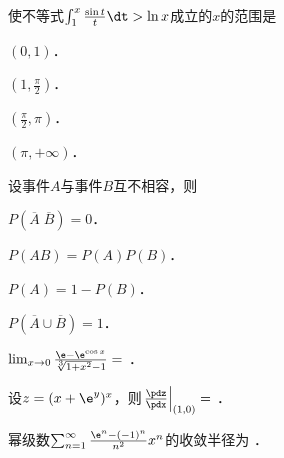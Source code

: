 \documentclass[plain,noanswer,medmath]{../../template/jnuexam}
\begin{document}










\begin{problem}
使不等式$\int_1^x \frac{\sin t}{t}\dt > \ln x$成立的$x$的范围是\pickout{}
\begin{abcd}
\item $(0,1)$．
\item $\left(1,\frac{\pi}{2} \right)$．
\item $\left(\frac{\pi}{2},\pi \right)$．
\item $(\pi , +\infty)$．
\end{abcd}
\end{problem}








\begin{problem}
设事件$A$与事件$B$互不相容，则\pickout{}
\begin{abcd}
\item $P(\overline{A}\;\overline{B}) = 0$．
\item $P(AB) = P(A)P(B)$．
\item $P(A) = 1 - P(B)$．
\item $P(\overline{A} \cup \overline{B}) = 1$．
\end{abcd}
\end{problem}






\begin{problem}
$\lim_{x \to 0} \frac{\e - \e^{\cos x}}{\sqrt[3]{1 + x^2} - 1} =$ \fillin{}．
\end{problem}


\begin{problem}
设$z = (x + \e^y)^x$，则$\left. \frac{\pdz}{\pdx} \right|_{(1,0)} =$ \fillin{}．
\end{problem}


\begin{problem}
幂级数$\sum_{n = 1}^{\infty}\frac{\e^n - (- 1)^n}{n^2}x^n$的收敛半径为 \fillin{}．
\end{problem}
\end{document}
